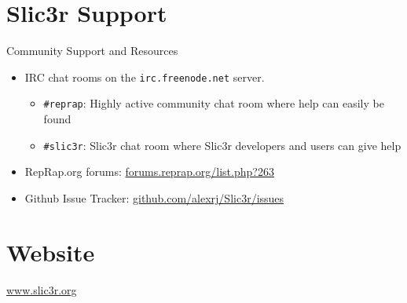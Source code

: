 \section{Slic3r Support} %
\label{sec:slic3r_support}


Community Support and Resources

\begin{itemize}

    \item IRC chat rooms on the \texttt{irc.freenode.net} server.
        \begin{itemize}
        \item \texttt{\#reprap}: Highly active community chat room where help can easily be found
        \item \texttt{\#slic3r}: Slic3r chat room where Slic3r developers and users can give help
        \end{itemize}

    \item RepRap.org forums: \url{forums.reprap.org/list.php?263}

    \item Github Issue Tracker: \url{github.com/alexrj/Slic3r/issues}

\end{itemize}


\section{Website} %
\label{sec:website}

\url{www.slic3r.org}


